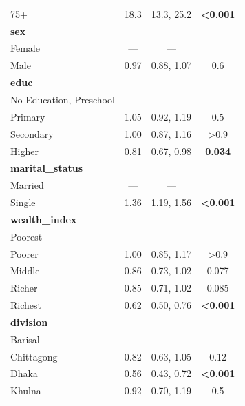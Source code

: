 \documentclass[
  12pt,
  a4paper]{article}
\begin{document}
\begin{longtable}[t]{lccc}
\hspace{1em}75+ & 18.3 & 13.3, 25.2 & \textbf{<0.001}\\
\textbf{sex} &  &  & \\
\hspace{1em}Female & — & — & \\
\hspace{1em}Male & 0.97 & 0.88, 1.07 & 0.6\\
\textbf{educ} &  &  & \\
\hspace{1em}No Education, Preschool & — & — & \\
\hspace{1em}Primary & 1.05 & 0.92, 1.19 & 0.5\\
\hspace{1em}Secondary & 1.00 & 0.87, 1.16 & >0.9\\
\hspace{1em}Higher & 0.81 & 0.67, 0.98 & \textbf{0.034}\\
\textbf{marital\_status} &  &  & \\
\hspace{1em}Married & — & — & \\
\hspace{1em}Single & 1.36 & 1.19, 1.56 & \textbf{<0.001}\\
\textbf{wealth\_index} &  &  & \\
\hspace{1em}Poorest & — & — & \\
\hspace{1em}Poorer & 1.00 & 0.85, 1.17 & >0.9\\
\hspace{1em}Middle & 0.86 & 0.73, 1.02 & 0.077\\
\hspace{1em}Richer & 0.85 & 0.71, 1.02 & 0.085\\
\hspace{1em}Richest & 0.62 & 0.50, 0.76 & \textbf{<0.001}\\
\textbf{division} &  &  & \\
\hspace{1em}Barisal & — & — & \\
\hspace{1em}Chittagong & 0.82 & 0.63, 1.05 & 0.12\\
\hspace{1em}Dhaka & 0.56 & 0.43, 0.72 & \textbf{<0.001}\\
\hspace{1em}Khulna & 0.92 & 0.70, 1.19 & 0.5\\

\end{longtable}
\end{document}
